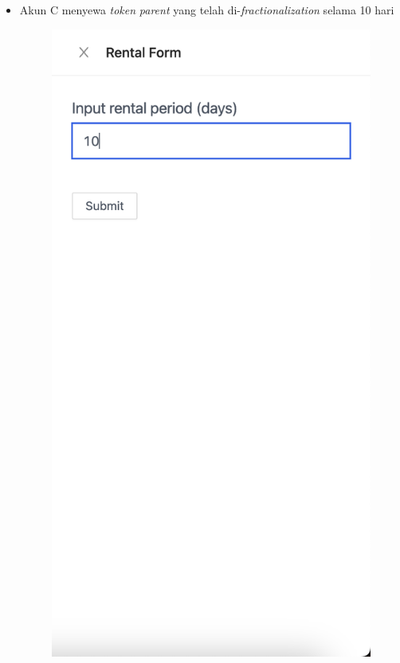 \begin{itemize}
      \item Akun C menyewa \emph{token} \emph{parent} yang telah di-\emph{fractionalization} selama 10 hari
        \begin{figure} [H] \centering
            \includegraphics[scale=0.4]{gambar/img-test-share-rent-1.png}

\end{figure}
\end{itemize}
